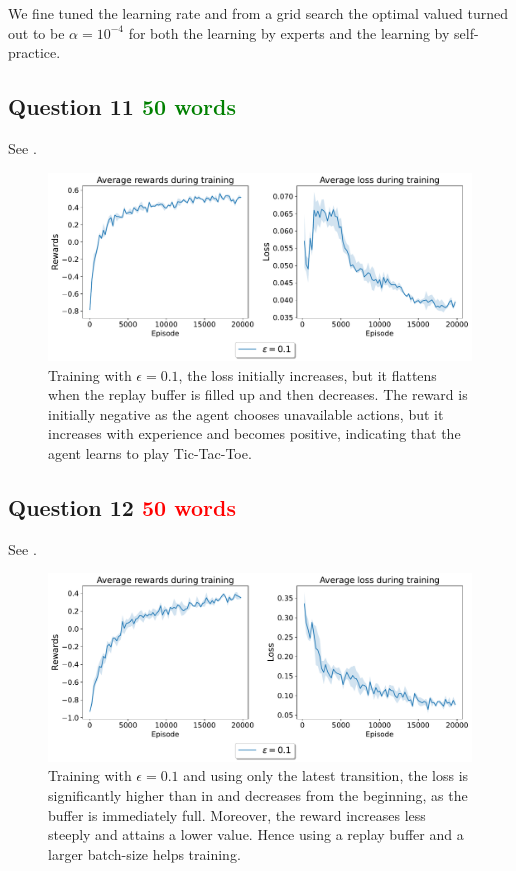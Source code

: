 \documentclass[10pt]{IEEEtran}
\begin{document}
We fine tuned the learning rate and from a grid search the optimal valued turned out to be $\alpha = 10^{-4}$ for both the learning by experts and the learning by self-practice.

\subsection*{Question 11 \textcolor{Green}{50 words}}
See .
\begin{figure}[h]
    \centering
    \includegraphics[width = \linewidth]{code/figures/rewards_epsilon_exploration_Q11.pdf}
    \caption{Training with $\epsilon = 0.1$, the loss initially increases, but it flattens when the replay buffer is filled up and then decreases. The reward is initially negative as the agent chooses unavailable actions, but it increases with experience and becomes positive, indicating that the agent learns to play Tic-Tac-Toe.}
    \label{plot_question11}
\end{figure}

\subsection*{Question 12 \textcolor{red}{50 words}}
See . 
\begin{figure}[h]
    \centering
    \includegraphics[width = \linewidth]{code/figures/rewards_epsilon_exploration_Q12.pdf}
    \caption{Training with $\epsilon = 0.1$ and  using only the latest transition, the loss is significantly higher than in  and decreases from the beginning, as the buffer is immediately full. Moreover, the reward increases less steeply and attains a lower value. Hence using a replay buffer and a larger batch-size helps training.}
    \label{plot_question12}
\end{figure}
\end{document}

